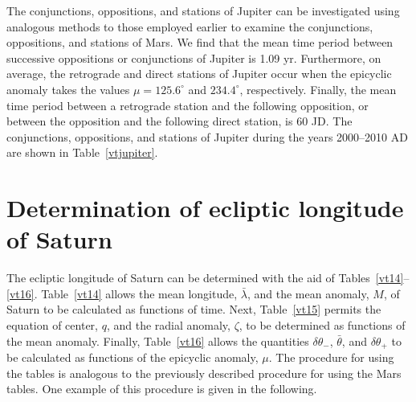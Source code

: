 The conjunctions, oppositions, and stations of Jupiter can be investigated
using analogous methods to those employed earlier to examine the
conjunctions, oppositions, and stations of Mars. We find that the mean
time period between successive oppositions or conjunctions of
Jupiter is 1.09 yr. Furthermore, on average, the retrograde and direct
stations of Jupiter occur when the epicyclic anomaly takes the
values $\mu=125.6^\circ$ and $234.4^\circ$, respectively. Finally,
the mean time period between a retrograde station and the following
opposition, or between the opposition and the following direct
station, is 60 JD. The conjunctions, oppositions, and stations of Jupiter
during the years 2000--2010 AD are shown in Table~\ref{vtjupiter}.

\section{Determination of ecliptic longitude of Saturn}
The ecliptic longitude of Saturn can be determined with the aid of Tables~\ref{vt14}--\ref{vt16}. Table~\ref{vt14} allows
the mean longitude, $\bar{\lambda}$, and the mean anomaly, $M$, of Saturn to be calculated as functions of
time. Next, Table~\ref{vt15} permits the equation of center, $q$, and the radial anomaly, $\zeta$, to
be determined as functions of the mean anomaly. Finally, Table~\ref{vt16} allows the quantities
$\delta\theta_-$, $\bar{\theta}$, and $\delta\theta_+$ to be calculated as functions of the epicyclic
anomaly, $\mu$. 
The procedure for using the tables is analogous to the previously described procedure for
using the Mars tables.
One example of this procedure is given in the following.


